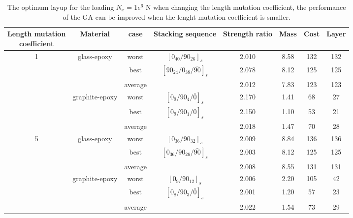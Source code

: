 \begin{table}
\caption{The optimum layup for the loading $N_x=1e^6$ N when changing the
length mutation coefficient, the performance of the GA can be improved
when the lenght mutation coefficient is smaller.} \centering
\begin{adjustbox}{width=1\textwidth}
	\begin{tabular}{cccccccc}
	\toprule
	\makecell{Length mutation \\ coefficient}		     &	 Material		               	 & case     & Stacking sequence    & Strength ratio  & Mass  &  Cost   & Layer    \\ 
	\midrule																															  
	\multirow{6}{*}{1} &	\multirow{3}{*}{glass-epoxy}   	 & worst     &  $[0_{40}/90_{26}]_s$                               & 2.010           & 8.58  & 132     & 132   \\
					   &								     & best      &  $[90_{24}/0_{38}/\bar{90}]_s$                      & 2.078           & 8.12  & 125     & 125  \\
					     &									 & average   &    		                                           & 2.012           & 7.83  & 123     & 123  \\
						 &	\multirow{3}{*}{graphite-epoxy}	 & worst     &  $[0_{9}/90_{4}/\bar{0}]_s$                         & 2.170           & 1.41  & 68      & 27      \\
					     &								     & best      &  $[0_{9}/90_{1}/\bar{0}]_s$                         & 2.150           & 1.10  & 53      & 21      \\
					     &								     & average   &                                                     & 2.018           & 1.47  & 70      & 28      \\ 
	\multirow{6}{*}{5} &	\multirow{3}{*}{glass-epoxy}   	 & worst     &  $[0_{36}/90_{32}]_s$                               &  2.009          & 8.84  &  136    &  136   \\
					   &								     & best      &  $[0_{36}/90_{26}/\bar{90}]_s$                      &  2.003          & 8.12  &  125    &  125   \\
					     &									 & average   &                                                     &  2.008          & 8.55  &  131    &  131  \\
						 &	\multirow{3}{*}{graphite-epoxy}	 & worst     &  $[0_{9}/90_{12}]_s$                                &  2.006          & 2.20  &  105    &  42  \\
						 &								     & best      &  $[0_{8}/90_{3}/\bar{0}]_s$                         &  2.001          & 1.20  &  57     &  23  \\
					     &								     & average   &                                                     &  2.022          & 1.54  &  73     &  29  \\
	\bottomrule																															  
\end{tabular}
\end{adjustbox}
\label{tab:optimum_layup}
\end{table}
            
            
